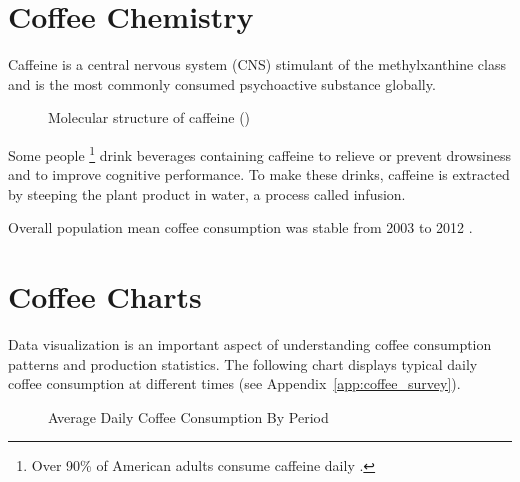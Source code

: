 \section{Coffee Chemistry}

Caffeine  is a central nervous system (CNS) stimulant of the
methylxanthine class and is the most commonly consumed psychoactive substance
globally.

\begin{figure}
    \centering
    \caption{Molecular structure of caffeine ()}
    \label{fig:caffeine_molecule}
\end{figure}

Some people
\footnote{Over 90\% of American adults consume caffeine daily
\cite{SleepFoundation1}.}
drink beverages containing caffeine to relieve or prevent drowsiness and to
improve cognitive performance. To make these drinks, caffeine is extracted by
steeping the plant product in water, a process called infusion.

Overall population mean coffee consumption was stable from 2003 to 2012
\cite{LOFTFIELD20161762}.

\section{Coffee Charts}

Data visualization is an important aspect of understanding coffee consumption
patterns and production statistics. The following chart displays typical daily
coffee consumption at different times (see Appendix~\ref{app:coffee_survey}).

\begin{figure}
    \caption{Average Daily Coffee Consumption By Period}
    \medskip
    \label{fig:coffee_consumption_chart}
\end{figure}
\bigskip

